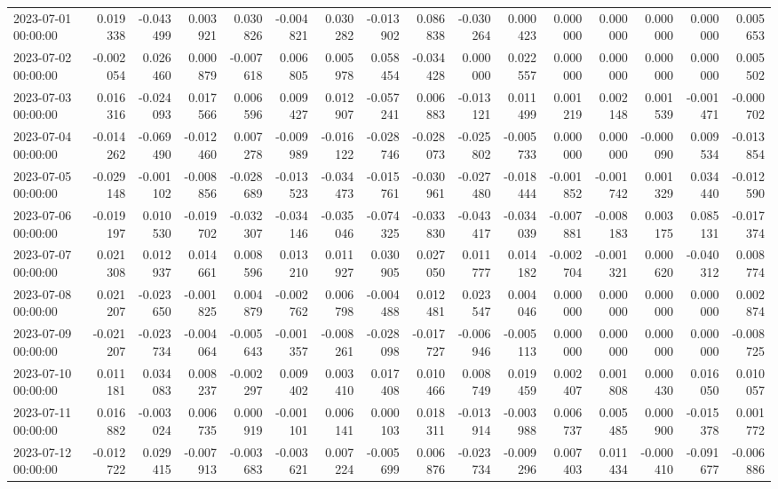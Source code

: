 \begin{tabular}{lrrrrrrrrrrrrrrr}
2023-07-01 00:00:00 & 0.019338 & -0.043499 & 0.003921 & 0.030826 & -0.004821 & 0.030282 & -0.013902 & 0.086838 & -0.030264 & 0.000423 & 0.000000 & 0.000000 & 0.000000 & 0.000000 & 0.005653 \\
2023-07-02 00:00:00 & -0.002054 & 0.026460 & 0.000879 & -0.007618 & 0.006805 & 0.005978 & 0.058454 & -0.034428 & 0.000000 & 0.022557 & 0.000000 & 0.000000 & 0.000000 & 0.000000 & 0.005502 \\
2023-07-03 00:00:00 & 0.016316 & -0.024093 & 0.017566 & 0.006596 & 0.009427 & 0.012907 & -0.057241 & 0.006883 & -0.013121 & 0.011499 & 0.001219 & 0.002148 & 0.001539 & -0.001471 & -0.000702 \\
2023-07-04 00:00:00 & -0.014262 & -0.069490 & -0.012460 & 0.007278 & -0.009989 & -0.016122 & -0.028746 & -0.028073 & -0.025802 & -0.005733 & 0.000000 & 0.000000 & -0.000090 & 0.009534 & -0.013854 \\
2023-07-05 00:00:00 & -0.029148 & -0.001102 & -0.008856 & -0.028689 & -0.013523 & -0.034473 & -0.015761 & -0.030961 & -0.027480 & -0.018444 & -0.001852 & -0.001742 & 0.001329 & 0.034440 & -0.012590 \\
2023-07-06 00:00:00 & -0.019197 & 0.010530 & -0.019702 & -0.032307 & -0.034146 & -0.035046 & -0.074325 & -0.033830 & -0.043417 & -0.034039 & -0.007881 & -0.008183 & 0.003175 & 0.085131 & -0.017374 \\
2023-07-07 00:00:00 & 0.021308 & 0.012937 & 0.014661 & 0.008596 & 0.013210 & 0.011927 & 0.030905 & 0.027050 & 0.011777 & 0.014182 & -0.002704 & -0.001321 & 0.000620 & -0.040312 & 0.008774 \\
2023-07-08 00:00:00 & 0.021207 & -0.023650 & -0.001825 & 0.004879 & -0.002762 & 0.006798 & -0.004488 & 0.012481 & 0.023547 & 0.004046 & 0.000000 & 0.000000 & 0.000000 & 0.000000 & 0.002874 \\
2023-07-09 00:00:00 & -0.021207 & -0.023734 & -0.004064 & -0.005643 & -0.001357 & -0.008261 & -0.028098 & -0.017727 & -0.006946 & -0.005113 & 0.000000 & 0.000000 & 0.000000 & 0.000000 & -0.008725 \\
2023-07-10 00:00:00 & 0.011181 & 0.034083 & 0.008237 & -0.002297 & 0.009402 & 0.003410 & 0.017408 & 0.010466 & 0.008749 & 0.019459 & 0.002407 & 0.001808 & 0.000430 & 0.016050 & 0.010057 \\
2023-07-11 00:00:00 & 0.016882 & -0.003024 & 0.006735 & 0.000919 & -0.001101 & 0.006141 & 0.000103 & 0.018311 & -0.013914 & -0.003988 & 0.006737 & 0.005485 & 0.000900 & -0.015378 & 0.001772 \\
2023-07-12 00:00:00 & -0.012722 & 0.029415 & -0.007913 & -0.003683 & -0.003621 & 0.007224 & -0.005699 & 0.006876 & -0.023734 & -0.009296 & 0.007403 & 0.011434 & -0.000410 & -0.091677 & -0.006886 \\

\end{tabular}
